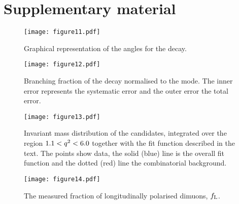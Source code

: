 \clearpage
\section{Supplementary material}
\label{sec:Supplementary}

\begin{figure}[h!]
\centering
\texttt{[image: figure11.pdf]}
\caption{Graphical representation of the angles for the \decay{\Lb}{\Lz\mumu} decay.}
\end{figure}

\begin{figure}[h!]
\centering
\texttt{[image: figure12.pdf]}
\caption{Branching fraction of the \decay{\Lb}{\Lz\mumu} decay
  normalised to the \decay{\Lb}{\jpsi\Lz} mode. The inner error
  represents the systematic error and the outer error the total
  error.} 
\label{fig:RelBR}
\end{figure}

\begin{figure}[tbp]
\centering \texttt{[image: figure13.pdf]}
\caption{\small Invariant mass distribution of the
  \decay{\Lb}{\Lz\mumu} candidates, integrated over the region  $1.1 < {q^2} < 6.0$ \gevgevcccc 
  together with the fit function described in the text.  The points show data,
  the solid (blue) line is the overall fit function and the dotted (red) line the
  combinatorial background.}
\label{fig:totalFitRare_lowq2}
\end{figure}

\begin{figure}[hbtp]
\centering
\texttt{[image: figure14.pdf]}
\caption{The measured fraction of longitudinally polarised dimuons,
  $f_{\rm L}$.}
\label{fig:fL}
\end{figure}

\clearpage

